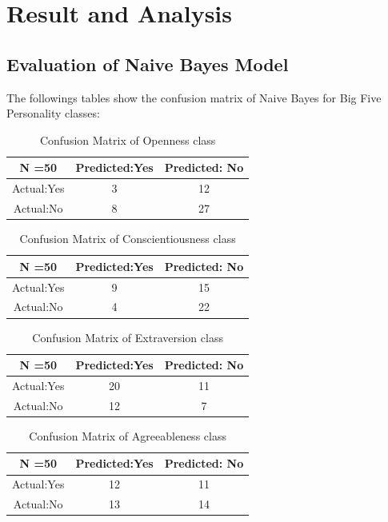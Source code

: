\documentclass[conference]{IEEEtran}
\begin{document}
\section{Result and Analysis}
\subsection{Evaluation of Naive Bayes Model}

The followings tables show the confusion matrix of Naive Bayes for Big Five Personality classes:

\FloatBarrier
\begin{table}[H]
\centering
\caption{Confusion Matrix of Openness class}
\begin{tabular}{ |c|c|c| }
 \hline
 N =50 & Predicted:Yes & Predicted: No \\
 \hline
 Actual:Yes&3 & 12 \\
 \hline
 Actual:No&8 & 27 \\
 \hline
\end{tabular}


\end{table}
\FloatBarrier
\begin{table}[H]
\centering
\caption{Confusion Matrix of Conscientiousness class}

\begin{tabular}{ |c|c|c| }
 \hline
 N =50 & Predicted:Yes & Predicted: No \\
 \hline
 Actual:Yes&9 & 15 \\
 \hline
 Actual:No&4 & 22 \\
 \hline
\end{tabular}
\end{table}
\FloatBarrier
\begin{table}[H]
\centering
 \caption{Confusion Matrix of Extraversion class}

\begin{tabular}{ |c|c|c| }
 \hline
 N =50 & Predicted:Yes & Predicted: No \\
 \hline
 Actual:Yes&20 & 11 \\
 \hline
 Actual:No&12 & 7 \\
 \hline
\end{tabular}
\end{table}
\FloatBarrier
\begin{table}[H]
\centering
 \caption{Confusion Matrix of Agreeableness class}

\begin{tabular}{ |c|c|c| }
 \hline
 N =50 & Predicted:Yes & Predicted: No \\
 \hline
 Actual:Yes&12 & 11 \\
 \hline
 Actual:No&13 & 14 \\
 \hline
\end{tabular}
\end{table}
\end{document}

